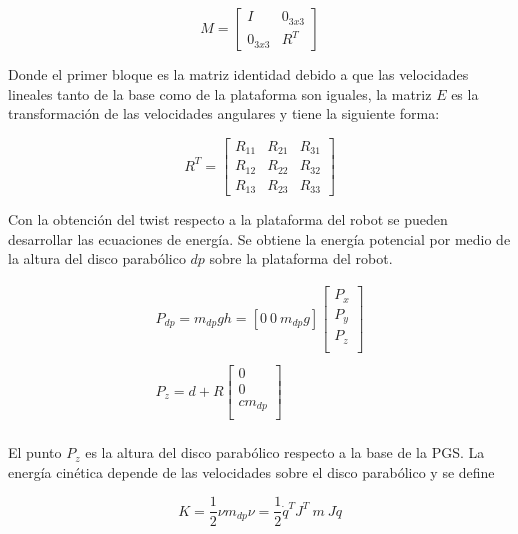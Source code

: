 \begin{equation}
M = \begin{bmatrix}
I & 0_{3x3} \\
0_{3x3} & R^T
\end{bmatrix}
\end{equation}


Donde el primer bloque es la matriz identidad debido a que 
las velocidades lineales tanto de la base como de la 
plataforma son iguales, la matriz $E$ es la transformación 
de las velocidades angulares y tiene la siguiente forma:

\begin{equation*}
R^T = \begin{bmatrix}
R_{11} & R_{21} & R_{31}\\
R_{12} & R_{22} & R_{32}\\
R_{13} & R_{23} & R_{33}
\end{bmatrix}
\end{equation*}

Con la obtención del twist respecto a la plataforma del 
robot se pueden desarrollar las ecuaciones de energía. Se 
obtiene la energía potencial por medio de la altura del 
disco parabólico $dp$ sobre la plataforma del robot.

\begin{equation}
\begin{split}
P_{dp} = m_{dp}gh = [0\ 0\ m_{dp}g] \begin{bmatrix}
P_x\\
P_y\\
P_z\\
\end{bmatrix}\\
\\
P_z = d + R\begin{bmatrix}
0\\
0\\
cm_{dp}\\
\end{bmatrix}\\
\end{split}
\end{equation}

El punto $P_z$ es la altura del disco parabólico respecto a 
la base de la PGS. La energía cinética depende de las 
velocidades sobre el disco parabólico y se define

\begin{equation}
K = \frac{1}{2} \nu m_{dp} \nu = \frac{1}{2} \dot{q}^T J^T\ m\ J \dot{q}
\end{equation}
